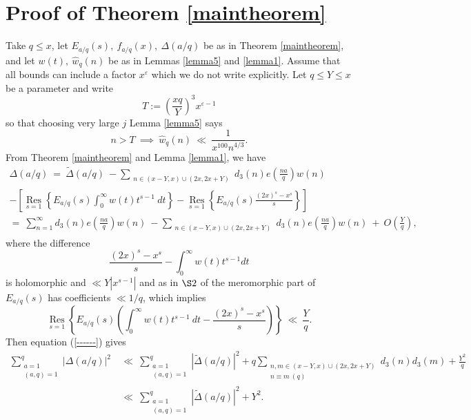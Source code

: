 \documentclass[oneside,reqno,10pt]{amsart}
\numberwithin{equation}{section}
\theoremstyle{plain}
\theoremstyle{definition}
\numberwithin{equation}{section}
\begin{document}
\section{Proof of Theorem \ref{maintheorem}}\label{proof-of-theorem}
Take $q\leq x$, let $E_{a/q}(s),\  f_{a/q}(x),\  \Delta(a/q)$  be as in Theorem \ref{maintheorem}, and let $w(t),\ \hat{w}_q(n)$ be as in Lemmas \ref{lemma5} and \ref{lemma1}. Assume that all bounds can include a factor $x^{\varepsilon}$ which we do not write explicitly. Let $q\leq Y\leq x$ be a parameter and write
\begin{equation*}
    T:=\left(\frac{xq}{Y}\right)^{3}x^{\varepsilon-1}
\end{equation*}
so that choosing very large $j$ Lemma \ref{lemma5} says
\begin{equation}\label{tiny error}
    n>T\ \implies \ \hat{w}_q(n)\ \ll \ \frac{1}{x^{100}n^{4/3}}.
\end{equation}
From Theorem \ref{maintheorem} and Lemma \ref{lemma1}, we have
\begin{multline}
    \Delta(a/q)\ =\ \tilde{\Delta}(a/q)\  - \sum_{\substack{n\in (x-Y,x)\cup(2x,2x+Y)}}d_3(n)e\left(\frac{na}{q}\right)w(n)\\ 
    -\left[\underset{s=1}{\operatorname{Res}}\left\{E_{a/q}(s)\int_{0}^{\infty} w(t)t^{s-1}\ dt \right\}- \underset{s=1}{\operatorname{Res}}\left\{E_{a/q}(s)\frac{(2x)^s-x^s}{s} \right\}\right]\\
    =\ \sum_{n=1}^{\infty} d_3(n)e\left(\frac{na}{q}\right)w(n)\ -\sum_{\substack{n\in (x-Y,x)\cup(2x,2x+Y)}}d_3(n)e\left(\frac{na}{q}\right)w(n)\ +\ O\left( \frac{Y}{q}\right),\label{------}
\end{multline}
where the difference 
\begin{equation*}
    \frac{(2x)^s-x^s}{s} - \int_{0}^{\infty} w(t)t^{s-1} dt
\end{equation*}
is holomorphic and $\ll Y|x^{s-1}|$ and as in $\S 2$ of  \cite{Iv} the meromorphic part of $E_{a/q}(s)$ has coefficients $\ll 1/q$, which implies
\begin{equation*}
    \underset{s=1}{\operatorname{Res}}\left\{E_{a/q}(s)\left(\int_{0}^{\infty} w(t)t^{s-1}\ dt - \frac{(2x)^s-x^s}{s}\right) \right\}\ \ll\ \frac{Y}{q}.
\end{equation*}
Then equation (\ref{------}) gives
\begin{align}\nonumber
    \sum_{\substack{a=1\\ (a,q)=1}}^q |\Delta(a/q)|^2\ &\ll \ \sum_{\substack{a=1\\ (a,q)=1}}^q |\tilde{\Delta}(a/q)|^2+q \sum_{\substack{n,m\in (x-Y,x)\cup(2x,2x+Y)\\ n\equiv m\ (q)}}d_3(n) d_3(m)+\frac{Y^2}{q} \\
    &\ll\ \sum_{\substack{a=1\\ (a,q)=1}}^q |\tilde{\Delta}(a/q)|^2 + Y^2.
\end{align}
\end{document}
